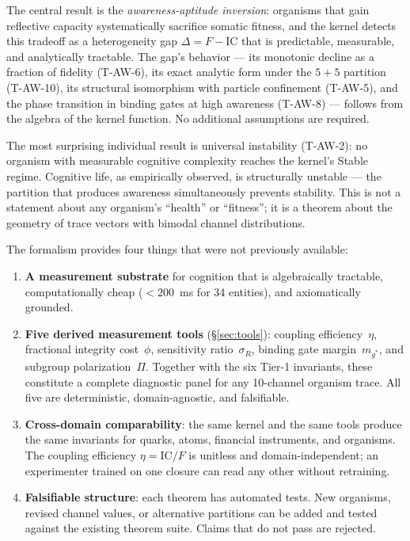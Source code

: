 \documentclass[
  aps,
  prd,
  twocolumn,
  superscriptaddress,
  nofootinbib,
  floatfix
]{revtex4-2}
\newcommand{\IC}{\mathrm{IC}}
\begin{document}
The central result is the \emph{awareness-aptitude inversion}:
organisms that gain reflective capacity systematically
sacrifice somatic fitness, and the kernel detects this tradeoff
as a heterogeneity gap $\Delta = F - \IC$ that is
predictable, measurable, and analytically tractable.  The
gap's behavior --- its monotonic decline as a fraction of
fidelity (T-AW-6), its exact analytic form under the $5\!+\!5$
partition (T-AW-10), its structural isomorphism with particle
confinement (T-AW-5), and the phase transition in binding
gates at high awareness (T-AW-8) --- follows from the
algebra of the kernel function.  No additional assumptions
are required.

The most surprising individual result is universal
instability (T-AW-2): no organism with measurable cognitive
complexity reaches the kernel's Stable regime.  Cognitive
life, as empirically observed, is structurally unstable ---
the partition that produces awareness simultaneously prevents
stability.  This is not a statement about any organism's
``health'' or ``fitness''; it is a theorem about the geometry
of trace vectors with bimodal channel distributions.

The formalism provides four things that were not previously
available:

\begin{enumerate}
\item \textbf{A measurement substrate} for cognition that is
  algebraically tractable, computationally cheap
  ($<200$~ms for 34 entities), and axiomatically grounded.

\item \textbf{Five derived measurement tools}
  (\S\ref{sec:tools}): coupling efficiency~$\eta$,
  fractional integrity cost~$\phi$, sensitivity
  ratio~$\sigma_R$, binding gate margin~$m_{g^*}$,
  and subgroup polarization~$\Pi$.  Together with the
  six Tier-1 invariants, these constitute a complete
  diagnostic panel for any 10-channel organism trace.
  All five are deterministic, domain-agnostic, and
  falsifiable.

\item \textbf{Cross-domain comparability}: the same kernel
  and the same tools produce the same invariants for quarks,
  atoms, financial instruments, and organisms.  The
  coupling efficiency $\eta = \IC/F$ is unitless and
  domain-independent; an experimenter trained on one
  closure can read any other without retraining.

\item \textbf{Falsifiable structure}: each theorem has
  automated tests.  New organisms, revised channel values,
  or alternative partitions can be added and tested against
  the existing theorem suite.  Claims that do not pass
  are rejected.
\end{enumerate}
\end{document}
